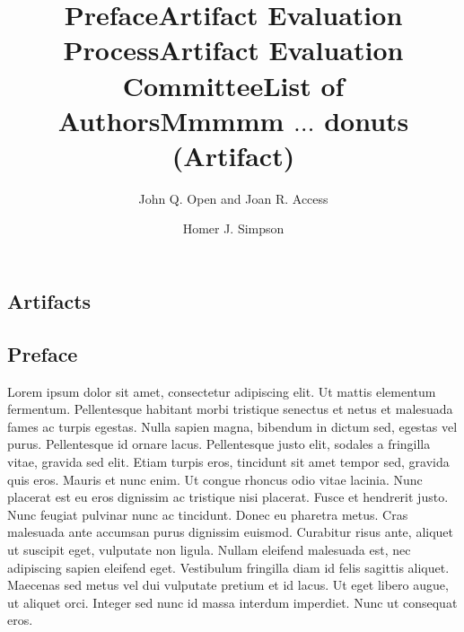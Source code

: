 \documentclass[a4paper,UKenglish]{dartsmaster-v2019}
\begin{document}



\begin{contentslist}

\contitem
\title{Preface}
\author{John Q. Open and Joan R. Access}

\contitem
\title{Artifact Evaluation Process}
\author{ }

\contitem
\title{Artifact Evaluation Committee}
\author{ }

\contitem
\title{List of Authors}
\author{ }

\part{Artifacts}


\contitem
\title{Mmmmm $\ldots$ donuts (Artifact)}
\author{Homer J. Simpson}


\end{contentslist}

\chapter{Preface} %

Lorem ipsum dolor sit amet, consectetur adipiscing elit. Ut mattis
elementum fermentum. Pellentesque habitant morbi tristique senectus et
netus et malesuada fames ac turpis egestas. Nulla sapien magna,
bibendum in dictum sed, egestas vel purus. Pellentesque id ornare
lacus. Pellentesque justo elit, sodales a fringilla vitae, gravida sed
elit. Etiam turpis eros, tincidunt sit amet tempor sed, gravida quis
eros. Mauris et nunc enim. Ut congue rhoncus odio vitae lacinia. Nunc
placerat est eu eros dignissim ac tristique nisi placerat. Fusce et
hendrerit justo. Nunc feugiat pulvinar nunc ac tincidunt. Donec eu
pharetra metus. Cras malesuada ante accumsan purus dignissim
euismod. Curabitur risus ante, aliquet ut suscipit eget, vulputate non
ligula. Nullam eleifend malesuada est, nec adipiscing sapien eleifend
eget. Vestibulum fringilla diam id felis sagittis aliquet. Maecenas
sed metus vel dui vulputate pretium et id lacus. Ut eget libero augue,
ut aliquet orci. Integer sed nunc id massa interdum imperdiet. Nunc ut
consequat eros.
\end{document}
